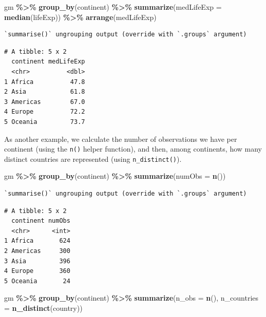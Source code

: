 \documentclass[
]{krantz}
\makeatletter
\newenvironment{Shaded}{\begin{snugshade}}{\end{snugshade}}
\newcommand{\DataTypeTok}[1]{\textcolor[rgb]{0.27,0.27,0.27}{#1}}
\newcommand{\KeywordTok}[1]{\textcolor[rgb]{0.27,0.27,0.27}{\textbf{#1}}}
\newcommand{\NormalTok}[1]{#1}
\newcommand{\OperatorTok}[1]{\textcolor[rgb]{0.43,0.43,0.43}{\textbf{#1}}}
\newcommand{\StringTok}[1]{\textcolor[rgb]{0.5,0.5,0.5}{#1}}
\newenvironment{kframe}{%
\medskip{}
\setlength{\fboxsep}{.8em}
 \def\at@end@of@kframe{}%
 \ifinner\ifhmode%
  \def\at@end@of@kframe{\end{minipage}}%
  \begin{minipage}{\columnwidth}%
 \fi\fi%
 \def\FrameCommand##1{\hskip\@totalleftmargin \hskip-\fboxsep
 \colorbox{shadecolor}{##1}\hskip-\fboxsep
     \hskip-\linewidth \hskip-\@totalleftmargin \hskip\columnwidth}%
 \MakeFramed {\advance\hsize-\width
   \@totalleftmargin\z@ \linewidth\hsize
   \@setminipage}}%
 {\par\unskip\endMakeFramed%
 \at@end@of@kframe}
\renewenvironment{Shaded}{\begin{kframe}}{\end{kframe}}
\makeatother
\begin{document}
\begin{Shaded}
\begin{Highlighting}[]
\NormalTok{gm }\OperatorTok{\%\textgreater{}\%}\StringTok{ }
\StringTok{  }\KeywordTok{group\_by}\NormalTok{(continent) }\OperatorTok{\%\textgreater{}\%}\StringTok{ }
\StringTok{  }\KeywordTok{summarize}\NormalTok{(}\DataTypeTok{medLifeExp =} \KeywordTok{median}\NormalTok{(lifeExp)) }\OperatorTok{\%\textgreater{}\%}\StringTok{ }
\StringTok{  }\KeywordTok{arrange}\NormalTok{(medLifeExp)}
\end{Highlighting}
\end{Shaded}

\begin{verbatim}
`summarise()` ungrouping output (override with `.groups` argument)
\end{verbatim}

\begin{verbatim}
# A tibble: 5 x 2
  continent medLifeExp
  <chr>          <dbl>
1 Africa          47.8
2 Asia            61.8
3 Americas        67.0
4 Europe          72.2
5 Oceania         73.7
\end{verbatim}

As another example, we calculate the number of observations we have per continent (using the \texttt{n()} helper function), and then, among continents, how many distinct countries are represented (using \texttt{n\_distinct()}).

\begin{Shaded}
\begin{Highlighting}[]
\NormalTok{gm }\OperatorTok{\%\textgreater{}\%}\StringTok{ }
\StringTok{  }\KeywordTok{group\_by}\NormalTok{(continent) }\OperatorTok{\%\textgreater{}\%}\StringTok{ }
\StringTok{  }\KeywordTok{summarize}\NormalTok{(}\DataTypeTok{numObs =} \KeywordTok{n}\NormalTok{())}
\end{Highlighting}
\end{Shaded}

\begin{verbatim}
`summarise()` ungrouping output (override with `.groups` argument)
\end{verbatim}

\begin{verbatim}
# A tibble: 5 x 2
  continent numObs
  <chr>      <int>
1 Africa       624
2 Americas     300
3 Asia         396
4 Europe       360
5 Oceania       24
\end{verbatim}

\begin{Shaded}
\begin{Highlighting}[]
\NormalTok{gm }\OperatorTok{\%\textgreater{}\%}
\StringTok{  }\KeywordTok{group\_by}\NormalTok{(continent) }\OperatorTok{\%\textgreater{}\%}
\StringTok{  }\KeywordTok{summarize}\NormalTok{(}\DataTypeTok{n\_obs =} \KeywordTok{n}\NormalTok{(), }\DataTypeTok{n\_countries =} \KeywordTok{n\_distinct}\NormalTok{(country))}
\end{Highlighting}
\end{Shaded}
\end{document}
